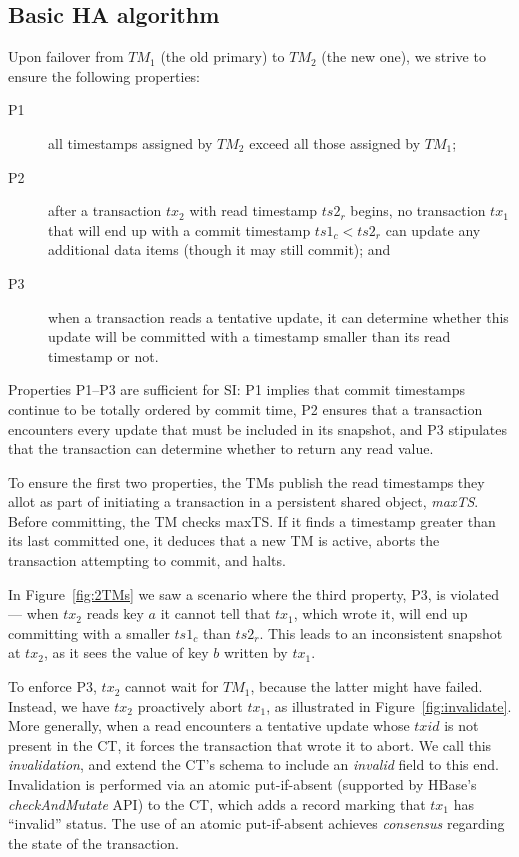 \subsection{Basic HA algorithm}
\label{ssec:basic}  

Upon failover from $TM_1$ (the old primary) to $TM_2$ (the new one), we strive to ensure the following  properties:
\begin{description}
\item[P1] all timestamps assigned by $TM_2$ exceed all those assigned by $TM_1$; 
\item[P2] after a transaction $tx_2$ with read timestamp $ts2_r$ begins, no transaction $tx_1$ that will end up with a commit timestamp $ts1_c < ts2_r$ can update any additional data items (though it may still commit); and 
\item[P3] when a transaction reads a tentative update, 
it can determine whether this update will be committed with a timestamp smaller than its read timestamp or not.
\end{description}

Properties P1--P3 are sufficient for SI: P1 implies that commit timestamps continue to be totally ordered by commit time, P2 ensures that a transaction encounters every update that must be included in its snapshot, and P3 stipulates that the transaction can determine whether to return any read value.

To ensure the first two properties, the TMs publish the read timestamps they allot as part of initiating a transaction in a persistent shared object,   \emph{maxTS}. %
Before committing, the TM checks maxTS. If it finds a timestamp greater than its last committed one, it deduces that a new TM is active, aborts the transaction attempting to commit, and halts. 

In Figure~\ref{fig:2TMs} we saw  a scenario where the third property, P3, is violated--- when $tx_2$ reads key $a$ it cannot tell that $tx_1$, which wrote it, will end up committing with a smaller $ts1_c$ than $ts2_r$. 
This leads to an inconsistent snapshot at $tx_2$, as it sees the value of key $b$ written by $tx_1$.

To enforce P3, $tx_2$ cannot wait for $TM_1$, because the latter might have failed. Instead, we have $tx_2$ proactively abort $tx_1$, as illustrated in Figure~\ref{fig:invalidate}. 
%
More generally, when a read encounters a tentative update whose $txid$ is not present in the CT, it forces 
the transaction that wrote it to abort. We call this {\em invalidation}, and extend the CT's schema to include an \emph{invalid} field to this end.
Invalidation is performed via an atomic 
put-if-absent (supported by HBase's {\em checkAndMutate\/} API)
to the CT, which adds a record marking that $tx_1$ has  
``invalid'' status.  
The use of an atomic put-if-absent achieves \emph{consensus} regarding the state of the transaction.

